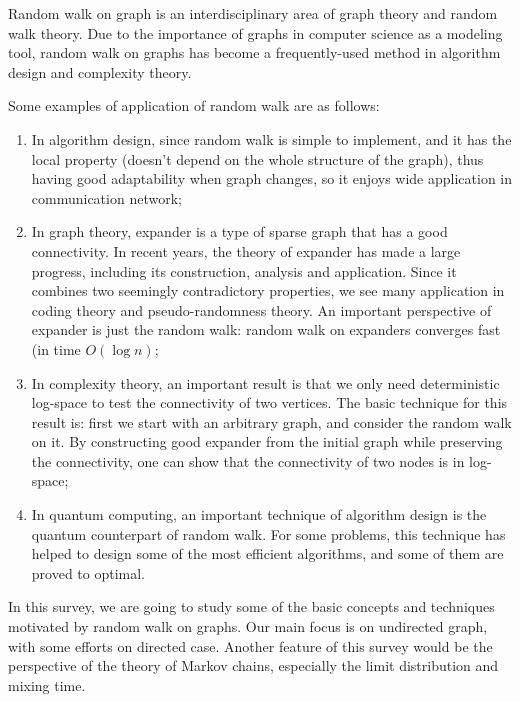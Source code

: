 Random walk on graph is an interdisciplinary area of graph theory
and random walk theory. Due to the importance of graphs in computer
science as a modeling tool, random walk on graphs has become a
frequently-used method in algorithm design and complexity theory.

Some examples of application of random walk are as follows:

\begin{enumerate}
\item In algorithm design, since random walk is simple to implement,
and it has the local property (doesn't depend on the whole structure
of the graph), thus having good adaptability when graph changes, so
it enjoys wide application in communication network;
\item In graph theory, expander is a type of sparse graph that has a
good connectivity. In recent years, the theory of expander has made
a large progress, including its construction, analysis and
application. Since it combines two seemingly contradictory
properties, we see many application in coding theory and
pseudo-randomness theory. An important perspective of expander is
just the random walk: random walk on expanders converges fast (in
time $O(\log n)$;
\item In complexity theory, an important result is that we only need
deterministic log-space to test the connectivity of two vertices.
\cite{stcon} The basic technique for this result is: first we start
with an arbitrary graph, and consider the random walk on it. By
constructing good expander from the initial graph while preserving
the connectivity, one can show that the connectivity of two nodes is
in log-space;
\item In quantum computing, an important technique of algorithm
design is the quantum counterpart of random walk. For some problems,
this technique has helped to design some of the most efficient
algorithms, and some of them are proved to optimal.
\end{enumerate}

In this survey, we are going to study some of the basic concepts and
techniques motivated by random walk on graphs. Our main focus is on
undirected graph, with some efforts on directed case. Another
feature of this survey would be the perspective of the theory of
Markov chains, especially the limit distribution and mixing time.
